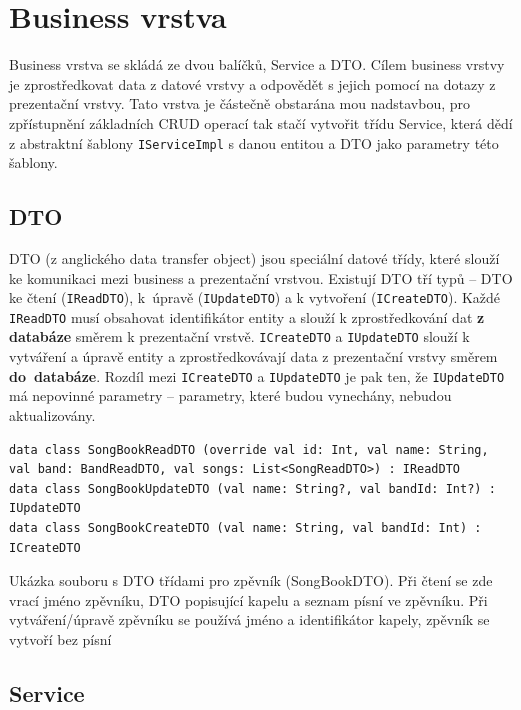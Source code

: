 \section{Business vrstva}

Business vrstva se skládá ze dvou balíčků, Service a DTO. Cílem business vrstvy je zprostředkovat data z datové vrstvy a odpovědět s jejich pomocí na dotazy z prezentační vrstvy. Tato vrstva je částečně obstarána mou nadstavbou, pro zpřístupnění základních CRUD operací tak stačí vytvořit třídu Service, která dědí z abstraktní šablony \texttt{IServiceImpl} s danou entitou a DTO jako parametry této šablony.

\subsection{DTO}

DTO (z anglického data transfer object) jsou speciální datové třídy, které slouží ke komunikaci mezi business a prezentační vrstvou. Existují DTO tří typů -- DTO ke čtení (\texttt{IReadDTO}), k~úpravě (\texttt{IUpdateDTO}) a k vytvoření (\texttt{ICreateDTO}). Každé \texttt{IReadDTO} musí obsahovat identifikátor entity a slouží k zprostředkování dat \textbf{z databáze} směrem k prezentační vrstvě. \texttt{ICreateDTO} a \texttt{IUpdateDTO} slouží k vytváření a úpravě entity a zprostředkovávají data z prezentační vrstvy směrem \textbf{do~databáze}. Rozdíl mezi \texttt{ICreateDTO} a \texttt{IUpdateDTO} je pak ten, že \texttt{IUpdateDTO} má nepovinné parametry -- parametry, které budou vynechány, nebudou aktualizovány.

\begin{listing}[H]
\begin{verbatim}
data class SongBookReadDTO (override val id: Int, val name: String, val band: BandReadDTO, val songs: List<SongReadDTO>) : IReadDTO
data class SongBookUpdateDTO (val name: String?, val bandId: Int?) : IUpdateDTO
data class SongBookCreateDTO (val name: String, val bandId: Int) : ICreateDTO
\end{verbatim}
\caption[Ukázka DTO tříd pro zpěvník]{Ukázka souboru s DTO třídami pro zpěvník (SongBookDTO). Při čtení se zde vrací jméno zpěvníku, DTO popisující kapelu a seznam písní ve zpěvníku. Při vytváření/úpravě zpěvníku se používá jméno a identifikátor kapely, zpěvník se vytvoří bez písní}
\end{listing}

\subsection{Service}

